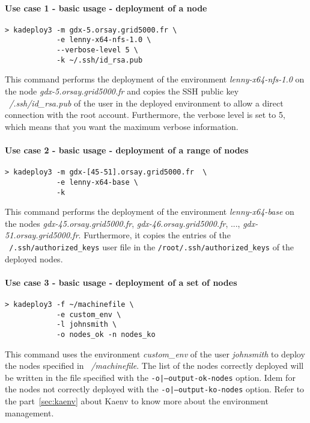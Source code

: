 \documentclass[a4wide,10pt,oneside]{book}
\begin{document}
\paragraph{Use case 1 - basic usage - deployment of a node}
\begin{verbatim}
> kadeploy3 -m gdx-5.orsay.grid5000.fr \
            -e lenny-x64-nfs-1.0 \
            --verbose-level 5 \
            -k ~/.ssh/id_rsa.pub
\end{verbatim}
This command performs the deployment of the environment \textit{lenny-x64-nfs-1.0} on the node \textit{gdx-5.orsay.grid5000.fr} and copies the SSH public key \textit{~/.ssh/id\_rsa.pub} of the user in the deployed environment to allow a direct connection with the root account. Furthermore, the verbose level is set to 5, which means that you want the maximum verbose information.


\paragraph{Use case 2 - basic usage - deployment of a range of nodes}
\begin{verbatim}
> kadeploy3 -m gdx-[45-51].orsay.grid5000.fr  \
            -e lenny-x64-base \
            -k
\end{verbatim}
This command performs the deployment of the environment \textit{lenny-x64-base} on the nodes \textit{gdx-45.orsay.grid5000.fr}, \textit{gdx-46.orsay.grid5000.fr}, ..., \textit{gdx-51.orsay.grid5000.fr}. Furthermore, it copies the entries of the \texttt{~/.ssh/authorized\_keys} user file in the \texttt{/root/.ssh/authorized\_keys} of the deployed nodes.

\paragraph{Use case 3 - basic usage - deployment of a set of nodes}
\begin{verbatim}
> kadeploy3 -f ~/machinefile \
            -e custom_env \
            -l johnsmith \
            -o nodes_ok -n nodes_ko
\end{verbatim}
This command uses the environment \textit{custom\_env} of the user \textit{johnsmith} to deploy the nodes specified in \textit{~/machinefile}. The list of the nodes correctly deployed will be written in the file specified with the \texttt{-o|--output-ok-nodes} option. Idem for the nodes not correctly deployed with the \texttt{-o|--output-ko-nodes} option. Refer to the part~\ref{sec:kaenv} about Kaenv to know more about the environment management.
\end{document}
